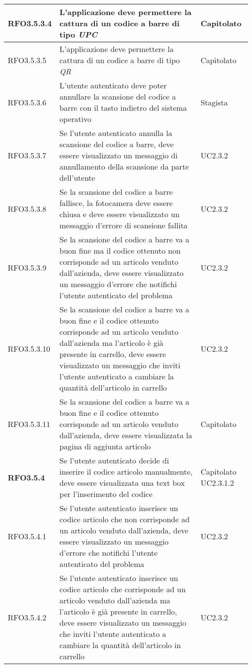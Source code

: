 {\begin{center}
\begin{longtable}{ | >{\centering\arraybackslash}p{2.5cm} | >{\arraybackslash}p{7cm} | >{\centering\arraybackslash}p{2cm} | }
RFO3.5.3.4 & L'applicazione deve permettere la cattura di un codice a barre di tipo \textit{UPC} & Capitolato \\ \hline
RFO3.5.3.5 & L'applicazione deve permettere la cattura di un codice a barre di tipo \textit{QR} & Capitolato \\ \hline
RFO3.5.3.6 & L'utente autenticato deve poter annullare la scansione del codice a barre con il tasto indietro del sistema operativo & Stagista \\ \hline
RFO3.5.3.7 & Se l'utente autenticato annulla la scansione del codice a barre, deve essere visualizzato un messaggio di annullamento della scansione da parte dell'utente & UC2.3.2 \\ \hline
RFO3.5.3.8 & Se la scansione del codice a barre fallisce, la fotocamera deve essere chiusa e deve essere visualizzato un messaggio d'errore di scansione fallita & UC2.3.2 \\ \hline
RFO3.5.3.9 & Se la scansione del codice a barre va a buon fine ma il codice ottenuto non corrisponde ad un articolo venduto dall'azienda, deve essere visualizzato un messaggio d'errore che notifichi l'utente autenticato del problema & UC2.3.2 \\ \hline
RFO3.5.3.10 & Se la scansione del codice a barre va a buon fine e il codice ottenuto corrisponde ad un articolo venduto dall'azienda ma l'articolo è già presente in carrello, deve essere visualizzato un messaggio che inviti l'utente autenticato a cambiare la quantità dell'articolo in carrello & UC2.3.2 \\ \hline
RFO3.5.3.11 & Se la scansione del codice a barre va a buon fine e il codice ottenuto corrisponde ad un articolo venduto dall'azienda, deve essere visualizzata la pagina di aggiunta articolo & Capitolato \\ \hline
\textbf{RFO3.5.4} & Se l'utente autenticato decide di inserire il codice articolo manualmente, deve essere visualizzata una text box per l'inserimento del codice & Capitolato UC2.3.1.2 \\ \hline
RFO3.5.4.1 & Se l'utente autenticato inserisce un codice articolo che non corrisponde ad un articolo venduto dall'azienda, deve essere visualizzato un messaggio d'errore che notifichi l'utente autenticato del problema & UC2.3.2 \\ \hline
RFO3.5.4.2 & Se l'utente autenticato inserisce un codice articolo che corrisponde ad un articolo venduto dall'azienda ma l'articolo è già presente in carrello, deve essere visualizzato un messaggio che inviti l'utente autenticato a cambiare la quantità dell'articolo in carrello & UC2.3.2 \\ \hline

\end{longtable}
\end{center}}
